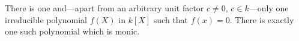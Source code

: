 There is one and---apart from an arbitrary unit factor $c \neq 0$, $c \in k$---only one irreducible polynomial $f(X)$ in $k[X]$ such that $f(x) = 0$. There is exactly one such polynomial which is monic.
